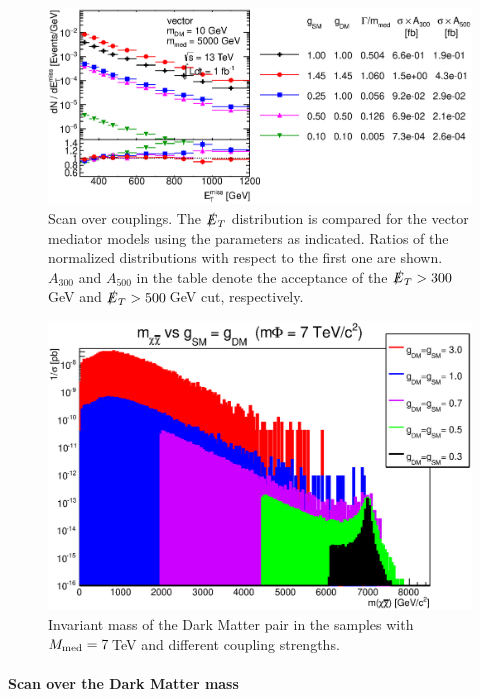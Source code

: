 \begin{figure}
\centering
\includegraphics[width=0.9\linewidth]{figures/monojet/scan_g_V_10_5000.eps}
\caption{Scan over couplings. The $\slashed{E}_T$ distribution is compared for the vector mediator models using the parameters as indicated. Ratios of the normalized distributions with respect to the first one are shown. $A_{300}$ and $A_{500}$ in the table denote the acceptance of the $\slashed{E}_T>300$\,GeV and $\slashed{E}_T>500$\,GeV cut, respectively.}
\label{fig:monojet_narrow}
\end{figure}

\begin{figure}
\centering
\includegraphics[width=0.9\linewidth]{figures/monojet/mphi_vs_g_xsecwgt_7tev.eps}
\caption{Invariant mass of the Dark Matter pair in the samples with $M_{\rm{med}}=7$\,TeV and different coupling strengths.}
\label{fig:monojet_mchichi}
\end{figure}

\paragraph{Scan over the Dark Matter mass}

